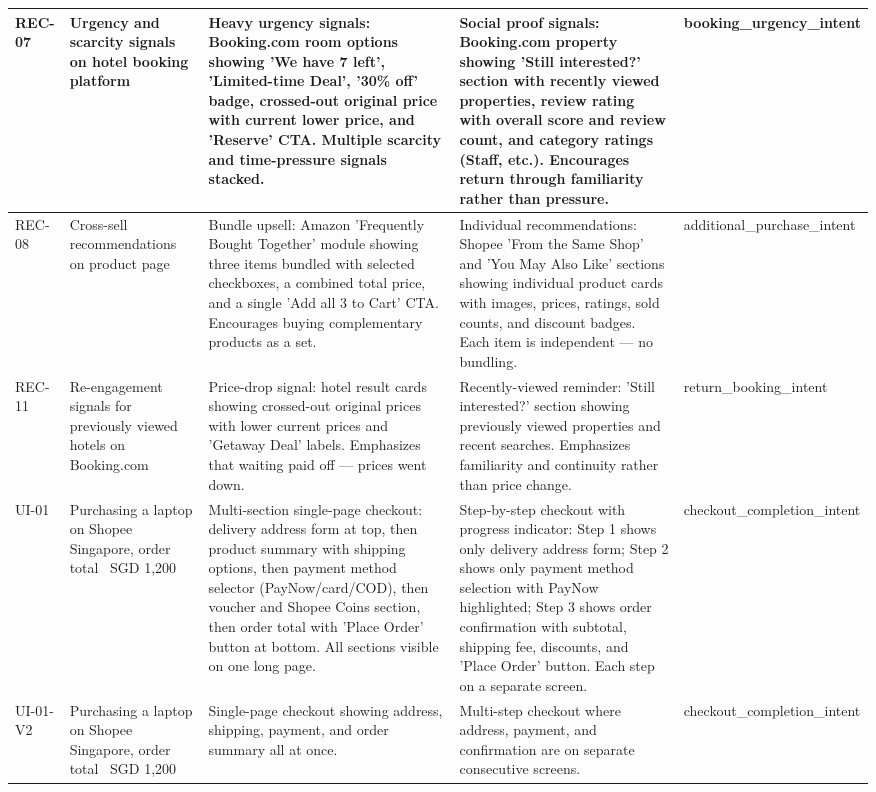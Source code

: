 \begin{table}[h]
\begin{tabular}{p{1.5cm} p{3.5cm} p{4cm} p{4cm} p{2cm}}
\midrule
REC-07 & Urgency and scarcity signals on hotel booking platform & Heavy urgency signals: Booking.com room options showing 'We have 7 left', 'Limited-time Deal', '30\% off' badge, crossed-out original price with current lower price, and 'Reserve' CTA. Multiple scarcity and time-pressure signals stacked. & Social proof signals: Booking.com property showing 'Still interested?' section with recently viewed properties, review rating with overall score and review count, and category ratings (Staff, etc.). Encourages return through familiarity rather than pressure. & booking_urgency_intent \\
\midrule
REC-08 & Cross-sell recommendations on product page & Bundle upsell: Amazon 'Frequently Bought Together' module showing three items bundled with selected checkboxes, a combined total price, and a single 'Add all 3 to Cart' CTA. Encourages buying complementary products as a set. & Individual recommendations: Shopee 'From the Same Shop' and 'You May Also Like' sections showing individual product cards with images, prices, ratings, sold counts, and discount badges. Each item is independent — no bundling. & additional_purchase_intent \\
\midrule
REC-11 & Re-engagement signals for previously viewed hotels on Booking.com & Price-drop signal: hotel result cards showing crossed-out original prices with lower current prices and 'Getaway Deal' labels. Emphasizes that waiting paid off — prices went down. & Recently-viewed reminder: 'Still interested?' section showing previously viewed properties and recent searches. Emphasizes familiarity and continuity rather than price change. & return_booking_intent \\
\midrule
UI-01 & Purchasing a laptop on Shopee Singapore, order total ~SGD 1,200 & Multi-section single-page checkout: delivery address form at top, then product summary with shipping options, then payment method selector (PayNow/card/COD), then voucher and Shopee Coins section, then order total with 'Place Order' button at bottom. All sections visible on one long page. & Step-by-step checkout with progress indicator: Step 1 shows only delivery address form; Step 2 shows only payment method selection with PayNow highlighted; Step 3 shows order confirmation with subtotal, shipping fee, discounts, and 'Place Order' button. Each step on a separate screen. & checkout_completion_intent \\
\midrule
UI-01-V2 & Purchasing a laptop on Shopee Singapore, order total ~SGD 1,200 & Single-page checkout showing address, shipping, payment, and order summary all at once. & Multi-step checkout where address, payment, and confirmation are on separate consecutive screens. & checkout_completion_intent \\

\end{tabular}
\end{table}
